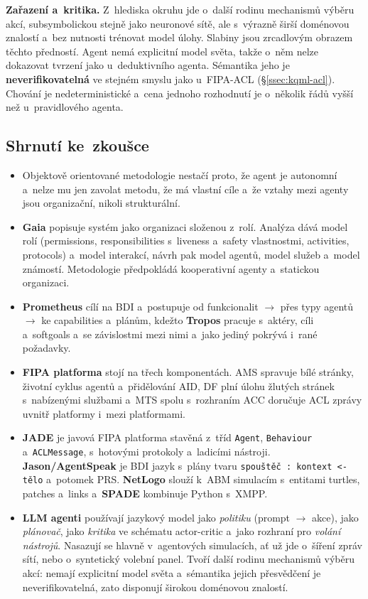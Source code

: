 \documentclass[11pt,a4paper]{article}
\theoremstyle{definition}
\begin{document}
\textbf{Zařazení a~kritika.} Z~hlediska okruhu jde o~další rodinu mechanismů výběru akcí,
subsymbolickou stejně jako neuronové sítě, ale s~výrazně širší doménovou znalostí a~bez
nutnosti trénovat model úlohy. Slabiny jsou zrcadlovým obrazem těchto předností. Agent nemá
explicitní model světa, takže o~něm nelze dokazovat tvrzení jako u~deduktivního agenta.
Sémantika jeho  je \textbf{neverifikovatelná} ve stejném smyslu jako
u~FIPA-ACL (\S\ref{ssec:kqml-acl}). Chování je nedeterministické a~cena jednoho rozhodnutí je
o~několik řádů vyšší než u~pravidlového agenta.

\subsection{Shrnutí ke~zkoušce}

\begin{itemize}
\item Objektově orientované metodologie nestačí proto, že agent je autonomní a~nelze mu jen
  zavolat metodu, že má vlastní cíle a~že vztahy mezi agenty jsou organizační, nikoli
  strukturální.
\item \textbf{Gaia} popisuje systém jako organizaci složenou z~rolí. Analýza dává model rolí
  (permissions, responsibilities s~liveness a~safety vlastnostmi, activities, protocols)
  a~model interakcí, návrh pak model agentů, model služeb a~model známostí. Metodologie
  předpokládá kooperativní agenty a~statickou organizaci.
\item \textbf{Prometheus} cílí na BDI a~postupuje od funkcionalit $\to$ přes typy agentů
  $\to$ ke capabilities a~plánům, kdežto \textbf{Tropos} pracuje s~aktéry, cíli a~softgoals
  a~se závislostmi mezi nimi a~jako jediný pokrývá i~rané požadavky.
\item \textbf{FIPA platforma} stojí na třech komponentách. AMS spravuje bílé stránky, životní
  cyklus agentů a~přidělování AID, DF plní úlohu žlutých stránek s~nabízenými službami
  a~MTS spolu s~rozhraním ACC doručuje ACL zprávy uvnitř platformy i~mezi platformami.
\item \textbf{JADE} je javová FIPA platforma stavěná z~tříd \texttt{Agent},
  \texttt{Behaviour} a~\texttt{ACLMessage}, s~hotovými protokoly a~ladicími nástroji.
  \textbf{Jason/AgentSpeak} je BDI jazyk s~plány tvaru \texttt{spouštěč : kontext <- tělo}
  a~potomek PRS. \textbf{NetLogo} slouží k~ABM simulacím s~entitami turtles, patches a~links
  a~\textbf{SPADE} kombinuje Python s~XMPP.
\item \textbf{LLM agenti} používají jazykový model jako \emph{politiku} (prompt $\to$ akce),
  jako \emph{plánovač}, jako \emph{kritika} ve schématu actor-critic a~jako rozhraní pro
  \emph{volání nástrojů}. Nasazují se hlavně v~agentových simulacích, ať už jde o~šíření zpráv
  sítí, nebo o~syntetický volební panel. Tvoří další rodinu mechanismů výběru akcí: nemají
  explicitní model světa a~sémantika jejich přesvědčení je neverifikovatelná, zato disponují
  širokou doménovou znalostí.
\end{itemize}
\end{document}
